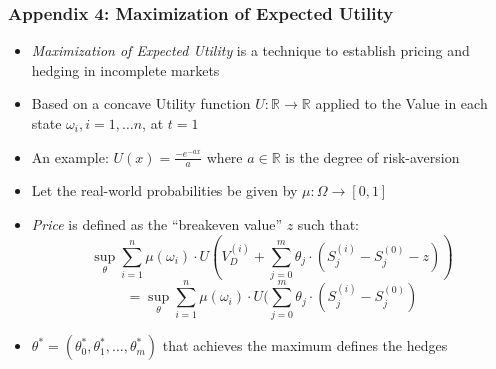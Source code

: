 \documentclass{beamer}
\begin{document}
\begin{frame}
\frametitle{Appendix 4: Maximization of Expected Utility}
\begin{itemize}
\item {\em Maximization of Expected Utility} is a technique to establish pricing and hedging in incomplete markets
\item Based on a concave Utility function $U : \mathbb{R} \rightarrow \mathbb{R}$ applied to the Value in each state $\omega_i, i = 1, \ldots n$, at $t=1$
\item An example: $U(x) = \frac {-e^{-ax}} {a}$ where $a \in \mathbb{R}$ is the degree of risk-aversion
\item Let the real-world probabilities be given by $\mu: \Omega \rightarrow [0,1]$
\item {\em Price} is defined as the ``breakeven value'' $z$ such that:
$$\sup_{\theta} \sum_{i=1}^n \mu(\omega_i) \cdot U(V_D^{(i)} + \sum_{j=0}^m \theta_j \cdot (S_j^{(i)} - S_j^{(0)} - z))$$
$$ = \sup_{\theta} \sum_{i=1}^n \mu(\omega_i) \cdot U(\sum_{j=0}^m \theta_j \cdot (S_j^{(i)} - S_j^{(0)})$$
\item $\theta^* = (\theta_0^*, \theta_1^*, \ldots, \theta_m^*)$ that achieves the maximum defines the hedges
\end{itemize}
\end{frame}
\end{document}
